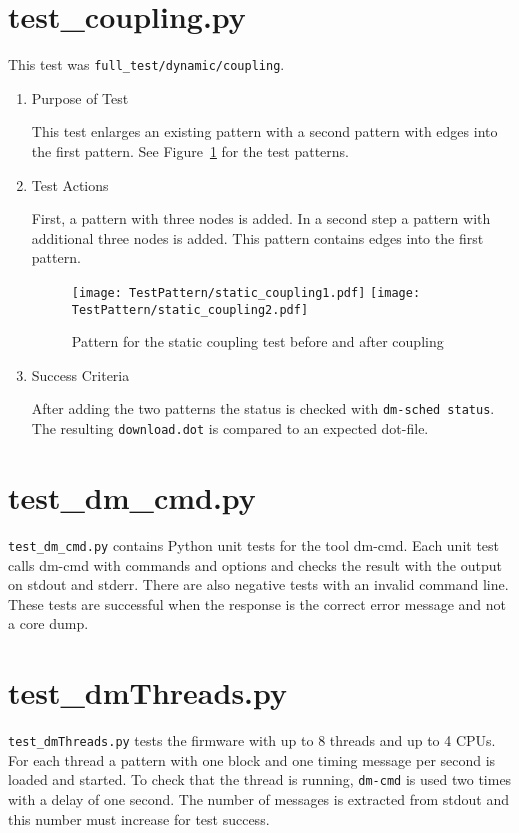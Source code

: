 \documentclass[12pt,a4paper]{report}
\begin{document}
\section{test\_coupling.py}
This test was \texttt{full\_test/dynamic/coupling}.
\begin{enumerate}
	\item Purpose of Test

	This test enlarges an existing pattern with a second pattern with edges into the first
	pattern. See Figure~\ref{fig:Pattern_for_the_static_coupling_test} for the test patterns.
	\item Test Actions

	First, a pattern with three nodes is added. In a second step a pattern with additional three nodes is added.
	This pattern contains edges into the first pattern.
    \begin{figure}
        \centering
        \texttt{[image: TestPattern/static\_coupling1.pdf]}
        \texttt{[image: TestPattern/static\_coupling2.pdf]}
        \caption{Pattern for the static coupling test before and after coupling}
        \label{fig:Pattern_for_the_static_coupling_test}
    \end{figure}
	\item Success Criteria

	After adding the two patterns the status is checked with \texttt{dm-sched status}. The resulting \texttt{download.dot} is
	compared to an expected dot-file.
\end{enumerate}

\section{test\_dm\_cmd.py}
\texttt{test\_dm\_cmd.py} contains Python unit tests for the tool dm-cmd. Each unit test calls dm-cmd
with commands and options and checks the result with the output on stdout and stderr. There are also negative tests with an invalid command
line. These tests are successful when the response is the correct error message and not a core dump.

\section{test\_dmThreads.py}
\texttt{test\_dmThreads.py} tests the firmware with up to 8 threads and up to 4 CPUs.
For each thread a pattern with one block and one timing message per second is loaded and started. To check that the thread is running,
\texttt{dm-cmd} is used two times with a delay of one second. The number of messages is extracted from stdout and this number must
increase for test success.
\end{document}
